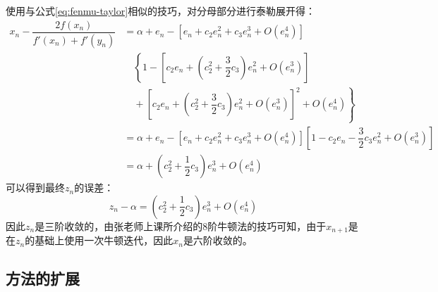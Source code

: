 使用与公式\ref{eq:fenmu-taylor}相似的技巧，对分母部分进行泰勒展开得：
\begin{equation}
    \begin{aligned}
        x_n - \dfrac{2f(x_n)}{f'(x_n) + f'(y_n)} &= \alpha + e_n - [e_n + c_2e_n^2 + c_3e_n^3 + O(e_n^4)] \\
        &\quad \left\{ 1 - \left[c_2e_n + \left(c_2^2 + \dfrac{3}{2}c_3  \right)e_n^2 + O(e_n^3)\right]\right. \\
        &\quad + \left.\left[c_2e_n + \left(c_2^2 + \dfrac{3}{2}c_3  \right)e_n^2 + O(e_n^3)\right]^2 + O(e_n^4) \right\}\\
        &= \alpha + e_n - [e_n + c_2e_n^2 + c_3e_n^3 + O(e_n^4)]\left[ 1 - c_2e_n - \dfrac{3}{2}c_3e_n^2 + O(e_n^3) \right] \\
        &= \alpha + \left(c_2^2  + \dfrac{1}{2}c_3 \right)e_n^3 + O(e_n^4)
    \end{aligned}
\end{equation}
可以得到最终$z_n$的误差：
\begin{equation}
    z_n - \alpha = \left(c_2^2  + \dfrac{1}{2}c_3 \right)e_n^3 + O(e_n^4)
\end{equation}
因此$z_n$是三阶收敛的，由张老师上课所介绍的8阶牛顿法的技巧可知，由于$x_{n+1}$是在$z_n$的基础上使用一次牛顿迭代，因此$x_n$是六阶收敛的。


\subsection{方法的扩展}






